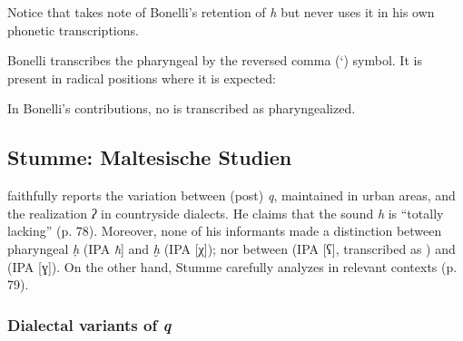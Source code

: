 \documentclass[output=paper]{langsci/langscibook}
\begin{document}
Notice that \citet[78]{Stumme1904} takes note of Bonelli's retention of \textit{h} but never uses it in his own phonetic transcriptions.

Bonelli transcribes the pharyngeal  by the reversed comma (‘) symbol. It is present in radical positions where it is expected:

\largerpage
\ea%
\begin{xlist}
\end{xlist}
\z

In Bonelli's contributions, no  is transcribed as pharyngealized.

\subsection{Stumme: Maltesische Studien}

\citet{Stumme1904} faithfully reports the  variation between (post) \textit{q}, maintained in urban areas, and the  realization \textit{ʔ} in countryside dialects. He claims that the sound \textit{h} is “totally lacking” (p. 78). Moreover, none of his informants made a distinction between pharyngeal \textit{ḥ} (IPA \textit{ħ}] and  \textit{ḫ} (IPA [χ]); nor between  {} (IPA [ʕ], transcribed as \textit{{\З}{}}) and \textit{} (IPA [ɣ]). On the other hand, Stumme carefully analyzes  in relevant contexts (p. 79).

\subsubsection{Dialectal variants of \textit{q}}
\end{document}
